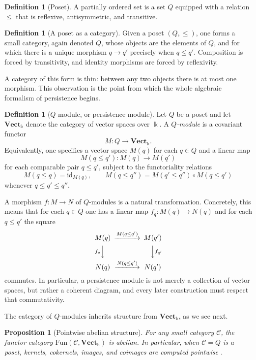 \documentclass[11pt]{article}
\newcommand{\kk}{\Bbbk}
\newtheorem{proposition}[theorem]{Proposition}
\theoremstyle{definition}
\newtheorem{defn}[theorem]{Definition}
\theoremstyle{remark}
\begin{document}
\begin{defn}[Poset]
A partially ordered set is a set $Q$ equipped with a relation $\leq$ that is reflexive, antisymmetric, and transitive.
\end{defn}

\begin{defn}[A poset as a category]
Given a poset $(Q,\leq)$, one forms a small category, again denoted $Q$, whose objects are the elements of $Q$, and for which there is a unique morphism $q\to q'$ precisely when $q\leq q'$.  Composition is forced by transitivity, and identity morphisms are forced by reflexivity.
\end{defn}

A category of this form is thin: between any two objects there is at most one morphism.  This observation is the point from which the whole algebraic formalism of persistence begins.

\begin{defn}[$Q$-module, or persistence module]
Let $Q$ be a poset and let $\mathbf{Vect}_{\kk}$ denote the category of vector spaces over $\kk$.  A \emph{$Q$-module} is a covariant functor
\[
M\colon Q \longrightarrow \mathbf{Vect}_{\kk}.
\]
Equivalently, one specifies a vector space $M(q)$ for each $q\in Q$ and a linear map
\[
M(q\leq q')\colon M(q)\to M(q')
\]
for each comparable pair $q\leq q'$, subject to the functoriality relations
\[
M(q\leq q)=\mathrm{id}_{M(q)}, \qquad
M(q\leq q'') = M(q'\leq q'')\circ M(q\leq q')
\]
whenever $q\leq q'\leq q''$.
\end{defn}

A morphism $f\colon M\to N$ of $Q$-modules is a natural transformation.  Concretely, this means that for each $q\in Q$ one has a linear map $f_q\colon M(q)\to N(q)$ and for each $q\leq q'$ the square
\[
\begin{CD}
M(q) @>{M(q\leq q')}>> M(q')\\
@V{f_q}VV @VV{f_{q'}}V\\
N(q) @>{N(q\leq q')}>> N(q')
\end{CD}
\]
commutes.  In particular, a persistence module is not merely a collection of vector spaces, but rather a coherent diagram, and every later construction must respect that commutativity.

The category of $Q$-modules inherits structure from $\mathbf{Vect}_{\kk}$, as we see next.

\begin{proposition}[Pointwise abelian structure]
For any small category $\mathcal{C}$, the functor category $\mathrm{Fun}(\mathcal{C},\mathbf{Vect}_{\kk})$ is abelian.  In particular, when $\mathcal{C}=Q$ is a poset, kernels, cokernels, images, and coimages are computed pointwise \cite{Mac98,Wei94}.
\end{proposition}
\end{document}
